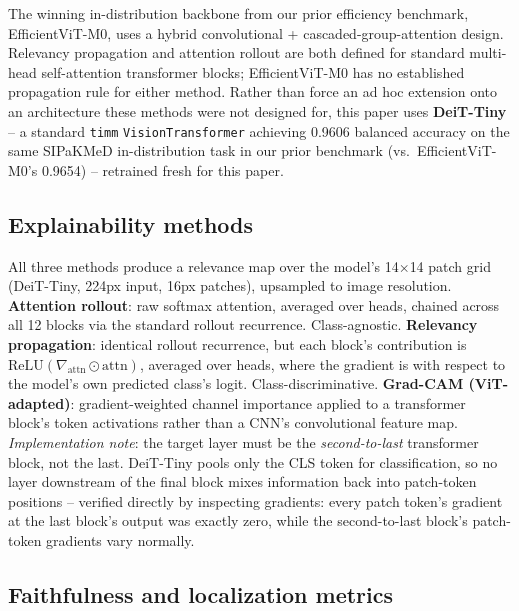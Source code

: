 \documentclass[runningheads]{llncs}
\begin{document}
The winning in-distribution backbone from our prior efficiency benchmark,
EfficientViT-M0, uses a hybrid convolutional + cascaded-group-attention
design. Relevancy propagation and attention rollout are both defined for
standard multi-head self-attention transformer blocks; EfficientViT-M0 has
no established propagation rule for either method. Rather than force an ad
hoc extension onto an architecture these methods were not designed for,
this paper uses \textbf{DeiT-Tiny} \cite{touvron2021deit} -- a standard
\texttt{timm} \texttt{VisionTransformer} achieving 0.9606 balanced
accuracy on the same SIPaKMeD in-distribution task in our prior benchmark
(vs.\ EfficientViT-M0's 0.9654) -- retrained fresh for this paper.

\subsection{Explainability methods}

All three methods produce a relevance map over the model's 14$\times$14
patch grid (DeiT-Tiny, 224px input, 16px patches), upsampled to image
resolution. \textbf{Attention rollout}: raw softmax attention, averaged
over heads, chained across all 12 blocks via the standard rollout
recurrence. Class-agnostic. \textbf{Relevancy propagation}: identical
rollout recurrence, but each block's contribution is
$\mathrm{ReLU}(\nabla_{\text{attn}} \odot \text{attn})$, averaged over
heads, where the gradient is with respect to the model's own predicted
class's logit. Class-discriminative. \textbf{Grad-CAM (ViT-adapted)}:
gradient-weighted channel importance applied to a transformer block's
token activations rather than a CNN's convolutional feature map.
\emph{Implementation note}: the target layer must be the
\emph{second-to-last} transformer block, not the last. DeiT-Tiny pools
only the CLS token for classification, so no layer downstream of the
final block mixes information back into patch-token positions --
verified directly by inspecting gradients: every patch token's gradient
at the last block's output was exactly zero, while the second-to-last
block's patch-token gradients vary normally.

\subsection{Faithfulness and localization metrics}
\end{document}
